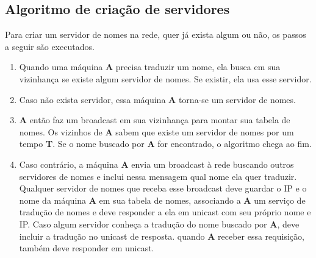     \subsection{Algoritmo de criação de servidores}
        Para criar um servidor de nomes na rede, quer já exista algum ou não, os
        passos a seguir são executados.
        \begin{enumerate}
            \item Quando uma máquina \textbf{A} precisa traduzir um nome, ela
            busca em sua vizinhança se existe algum servidor de nomes. Se existir,
            ela usa esse servidor.
            \item Caso não exista servidor, essa máquina \textbf{A} torna-se um 
            servidor de nomes.
            \item \textbf{A} então faz um broadcast em sua vizinhança para montar
            sua tabela de nomes. Os vizinhos de \textbf{A} sabem que existe um
            servidor de nomes por um tempo \textbf{T}. Se o nome buscado por
            \textbf{A} for encontrado, o algoritmo chega ao fim.
            \item Caso contrário, a máquina \textbf{A} envia um broadcast à rede
            buscando outros servidores de nomes e inclui nessa mensagem qual nome
            ela quer traduzir. Qualquer servidor de nomes que receba esse broadcast
            deve guardar o IP e o nome da máquina \textbf{A} em sua tabela de nomes,
            associando a \textbf{A} um serviço de tradução de nomes e deve
            responder a ela em unicast com seu próprio nome e IP. Caso algum
            servidor conheça a tradução do nome buscado por \textbf{A}, deve
            incluir a tradução no unicast de resposta. quando \textbf{A}
            receber essa requisição, também deve responder em unicast.
        \end{enumerate}
    
